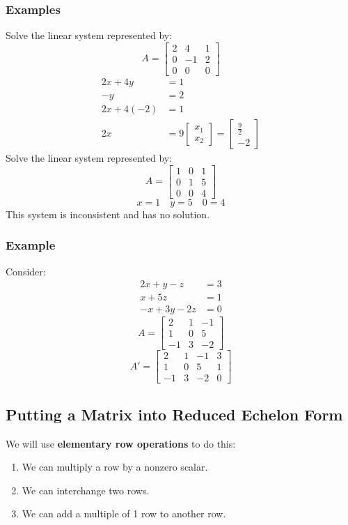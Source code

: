 \documentclass{math}
\begin{document}
\subsubsection*{Examples}
Solve the linear system represented by:
\[ A = \left[\begin{array}{cc|c}
  2 & 4 & 1 \\
  0 & -1 & 2 \\
  0 & 0 & 0
\end{array}\right] \]
\begin{align*}
  2x+4y &= 1 \\
  -y &= 2 \\
  2x+4(-2) &= 1 \\
  2x &= 9
  \begin{bmatrix}x_1 \\ x_2\end{bmatrix} = \begin{bmatrix}
    \frac{9}{2} \\ -2
  \end{bmatrix}
\end{align*}
Solve the linear system represented by:
\[ A = \left[\begin{array}{cc|c}
  1 & 0 & 1 \\
  0 & 1 & 5 \\
  0 & 0 & 4
\end{array}\right] \]
\[ x = 1 \quad y = 5 \quad 0 = 4 \]
This system is inconsistent and has no solution.

\subsubsection*{Example}
Consider:
\begin{align*}
  2x+y-z &= 3 \\
  x+5z &= 1\\
  -x+3y-2z &= 0
\end{align*}
\[ A = \begin{bmatrix}
  2 & 1 & -1 \\
  1 & 0 & 5 \\
  -1 & 3 & -2
\end{bmatrix} \]
\[ A' = \left[\begin{array}{ccc|c}
  2 & 1 & -1 & 3 \\
  1 & 0 & 5 & 1 \\
  -1 & 3 & -2 & 0
\end{array}\right] \]

\subsection*{Putting a Matrix into Reduced Echelon Form}
We will use \textbf{elementary row operations} to do this:
\begin{enumerate}
  \item We can multiply a row by a nonzero scalar.
  \item We can interchange two rows.
  \item We can add a multiple of 1 row to another row.
\end{enumerate}
\end{document}
